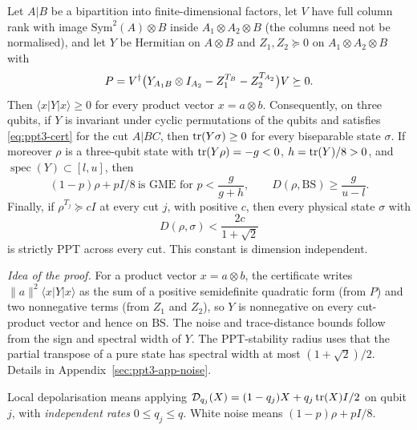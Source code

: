 \begin{lemma}\label{lem:ppt3-dps}
Let $A|B$ be a bipartition into finite-dimensional factors, let $V$ have full column rank with image
$\mathrm{Sym}^2(A)\otimes B$ inside $A_1\otimes A_2\otimes B$ (the columns need not be normalised), and let $Y$ be
Hermitian on $A\otimes B$ and $Z_1,Z_2\succeq0$ on $A_1\otimes A_2\otimes B$ with
\begin{equation}\label{eq:ppt3-cert}
P=V^{\dagger}\bigl(Y_{A_1B}\otimes I_{A_2}-Z_1^{T_B}-Z_2^{T_{A_2}}\bigr)V\succeq0 .
\end{equation}
Then $\langle x|Y|x\rangle\ge0$ for every product vector $x=a\otimes b$. Consequently, on three qubits, if $Y$ is invariant
under cyclic permutations of the qubits and satisfies \eqref{eq:ppt3-cert} for the cut $A|BC$, then
$\operatorname{tr}(Y\sigma)\ge0$ for every biseparable state $\sigma$. If moreover $\rho$ is a three-qubit state with
$\operatorname{tr}(Y\rho)=-g<0$, $h=\operatorname{tr}(Y)/8>0$, and $\operatorname{spec}(Y)\subset[l,u]$, then
\begin{equation}\label{eq:ppt3-stability}
(1-p)\rho+pI/8\ \text{is GME for }p<\frac g{g+h},\qquad D(\rho,\mathrm{BS})\ge\frac g{u-l}.
\end{equation}
Finally, if $\rho^{T_j}\succeq cI$ at every cut $j$, with positive $c$, then every
physical state $\sigma$ with
\[
D(\rho,\sigma)<\frac{2c}{1+\sqrt2}
\]
is strictly PPT across every cut. This constant is dimension independent.
\end{lemma}

\emph{Idea of the proof.} For a product vector $x=a\otimes b$, the certificate writes $\|a\|^2\langle x|Y|x\rangle$ as the sum of a positive
semidefinite quadratic form (from $P$) and two nonnegative terms (from $Z_1$ and $Z_2$), so $Y$ is nonnegative on every cut-product vector and hence on $\mathrm{BS}$.
The noise and trace-distance bounds follow from the sign and spectral width of $Y$. The PPT-stability radius uses that the partial transpose of
a pure state has spectral width at most $(1+\sqrt2)/2$. Details in Appendix~\ref{sec:ppt3-app-noise}.

Local depolarisation means applying $\mathcal D_{q_j}(X)=(1-q_j)X+q_j\operatorname{tr}(X)I/2$ on qubit $j$, with
\emph{independent rates} $0\le q_j\le q$. White noise means $(1-p)\rho+pI/8$.

